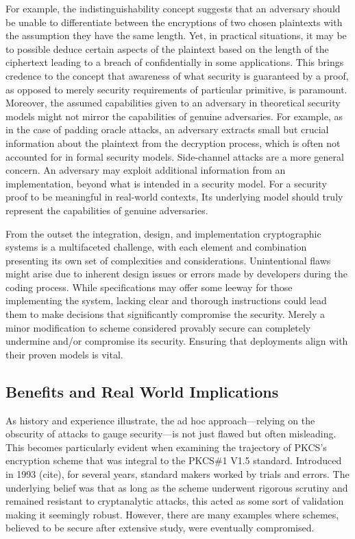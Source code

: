 \documentclass[]{final_report}
\theoremstyle{definition}
\begin{document}
For example, the indistinguishability concept suggests that an adversary should be unable to differentiate between the encryptions of two chosen plaintexts with the assumption they have the same length. Yet, in practical situations, it may be to possible deduce certain aspects of the plaintext based on the length of the ciphertext leading to a breach of confidentially in some applications. This brings credence to the concept that awareness of what security is guaranteed by a proof, as opposed to merely security requirements of particular primitive, is paramount.  Moreover, the assumed capabilities given to an adversary in theoretical security models might not mirror the capabilities of genuine adversaries. For example, as in the case of padding oracle attacks, an adversary extracts small but crucial information about the plaintext from the decryption process, which is often not accounted for in formal security models. Side-channel attacks are a more general concern. An adversary may exploit additional information from an implementation, beyond what is intended in a security model. For a security proof to be meaningful in real-world contexts, Its underlying model should truly represent the capabilities of genuine adversaries.

From the outset the integration, design, and implementation cryptographic systems is a multifaceted challenge, with each element and combination presenting its own set of complexities and considerations. Unintentional flaws might arise due to inherent design issues or errors made by developers during the coding process. While specifications may offer some leeway for those implementing the system, lacking clear and thorough instructions could lead them to make decisions that significantly compromise the security. Merely a minor modification to scheme considered provably secure can completely undermine and/or compromise its security. Ensuring that deployments align with their proven models is vital.


\subsection{Benefits and Real World Implications}
As history and experience illustrate, the ad hoc approach—relying on the obscurity of attacks to gauge security—is not just flawed but often misleading. This becomes particularly evident when examining the trajectory of PKCS's encryption scheme that was integral to the PKCS\#1 V1.5 standard. Introduced in 1993 (cite), for several years, standard makers worked by trials and errors. The underlying belief was that as long as the scheme underwent rigorous scrutiny and remained resistant to cryptanalytic attacks, this acted as some sort of validation making it seemingly robust. However, there are many examples where schemes, believed to be secure after extensive study, were eventually compromised.
\end{document}

